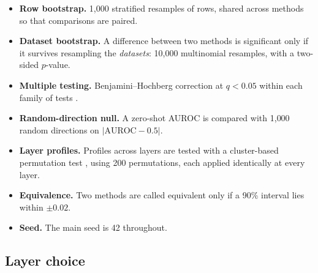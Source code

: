 \begin{itemize}
\item \textbf{Row bootstrap.} 1{,}000 stratified resamples of rows, shared across methods so that comparisons are paired. %
\item \textbf{Dataset bootstrap.} A difference between two methods is significant only if it survives resampling the \emph{datasets}: 10{,}000 multinomial resamples, with a two-sided $p$-value. %
\item \textbf{Multiple testing.} Benjamini--Hochberg correction at $q<0.05$ within each family of tests \parencite{benjamini1995fdr}. %
\item \textbf{Random-direction null.} A zero-shot AUROC is compared with 1{,}000 random directions on $|\text{AUROC}-0.5|$. %
\item \textbf{Layer profiles.} Profiles across layers are tested with a cluster-based permutation test \parencite{maris2007nonparametric}, using 200 permutations, each applied identically at every layer. %
\item \textbf{Equivalence.} Two methods are called equivalent only if a 90\% interval lies within $\pm0.02$. %
\item \textbf{Seed.} The main seed is 42 throughout. %
\end{itemize}

\subsection{Layer choice}
\label{sec:m-layers}

